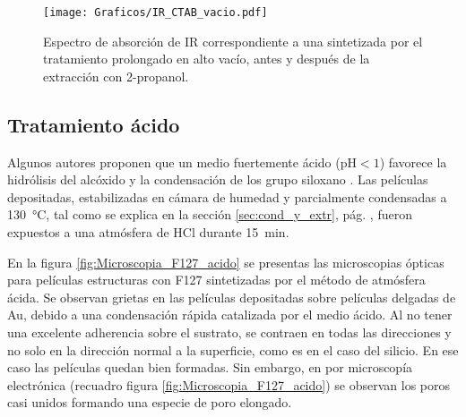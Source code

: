 {		\begin{figure}[!ht]
			 	\begin{center}
			 	\texttt{[image: Graficos/IR\_CTAB\_vacio.pdf]}
			 	\caption[FTIR \pdmC\space tratamiento prolongado.]{Espectro de absorción de IR correspondiente a una \pdmC\space sintetizada por el tratamiento prolongado en alto vacío, antes y después de la extracción con 2-propanol.}
			 	\label{fig:IR_CTAB_vacio}
			 	\end{center}
			 	\end{figure}
			
	\subsection{Tratamiento ácido}
		
		Algunos autores proponen que un medio fuertemente ácido (pH$<1$) favorece la hidrólisis del alcóxido y la condensación de los grupo siloxano \cite{Soler-Illia2011,Doshi2000a,Boissiere2000,Huo1996,Beck1992}. Las películas depositadas, estabilizadas en cámara de humedad y  parcialmente condensadas a \SI{130}{\celsius}, tal como se explica en la sección \ref{sec:cond_y_extr}, pág. \pageref{sec:cond_y_extr}, fueron expuestos a una atmósfera de HCl durante \SI{15}{\minute}. 

		En la figura \ref{fig:Microscopia_F127_acido} se presentas las microscopias ópticas para películas estructuras con F127 sintetizadas por el método de atmósfera ácida. Se observan grietas en las películas depositadas sobre películas delgadas de Au, debido a una condensación rápida catalizada por el medio ácido. Al no tener una excelente adherencia sobre el sustrato, se contraen en todas las direcciones y no solo en la dirección normal a la superficie, como es en el caso del silicio\cite{Sakatani2006,Boissiere2005,Guillemin2010}. En ese caso las películas quedan bien formadas. Sin embargo, en por microscopía electrónica (recuadro figura \ref{fig:Microscopia_F127_acido}) se observan los poros casi unidos formando una especie de poro elongado.

}

